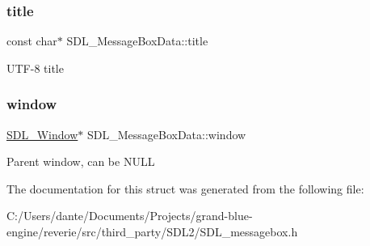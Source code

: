 \subsubsection{\texorpdfstring{title}{title}}
{\footnotesize\ttfamily const char$\ast$ S\+D\+L\+\_\+\+Message\+Box\+Data\+::title}

U\+T\+F-\/8 title \mbox{\label{struct_s_d_l___message_box_data_a5c333bc93705c66068e140bc28daedcb}} 
\subsubsection{\texorpdfstring{window}{window}}
{\footnotesize\ttfamily \mbox{\hyperlink{_s_d_l__video_8h_a55a196c7d3b8497538632c79ae1e6392}{S\+D\+L\+\_\+\+Window}}$\ast$ S\+D\+L\+\_\+\+Message\+Box\+Data\+::window}

Parent window, can be N\+U\+LL 

The documentation for this struct was generated from the following file\+:\begin{DoxyCompactItemize}
\item 
C\+:/\+Users/dante/\+Documents/\+Projects/grand-\/blue-\/engine/reverie/src/third\+\_\+party/\+S\+D\+L2/S\+D\+L\+\_\+messagebox.\+h\end{DoxyCompactItemize}
